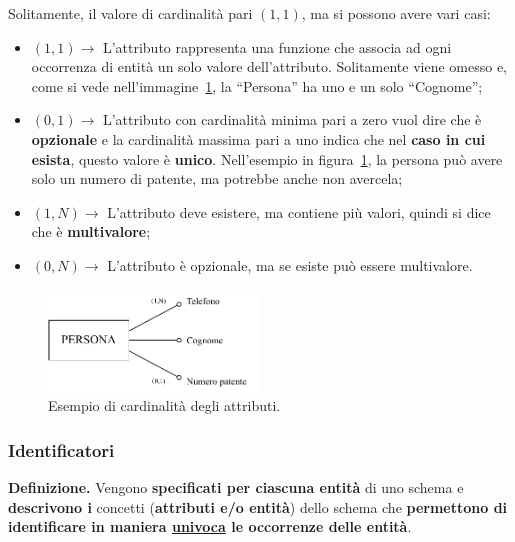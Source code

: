 \documentclass[a4paper]{article}
\newcommand{\dquotes}[1]{``#1''}
\begin{document}
	\noindent
	Solitamente, il valore di cardinalità pari $\left(1,1\right)$,  ma si possono avere vari casi:
	
	\begin{itemize}
		\item $\left(1, 1\right) \longrightarrow$ L'attributo rappresenta una funzione che associa ad ogni occorrenza di entità un solo valore dell'attributo. Solitamente viene omesso e, come si vede nell'immagine~\ref{esempio cardinalità attributi}, la \dquotes{Persona} ha uno e un solo \dquotes{Cognome};
		
		\item $\left(0, 1\right) \longrightarrow$ L'attributo con cardinalità minima pari a zero vuol dire che è \textbf{opzionale} e la cardinalità massima pari a uno indica che nel \textbf{caso in cui esista}, questo valore è \textbf{unico}. Nell'esempio in figura~\ref{esempio cardinalità attributi}, la persona può avere solo un numero di patente, ma potrebbe anche non avercela;
		
		\item $\left(1, N\right) \longrightarrow$ L'attributo deve esistere, ma contiene più valori, quindi si dice che è \textbf{multivalore};
		
		\item $\left(0, N\right) \longrightarrow$ L'attributo è opzionale, ma se esiste può essere multivalore.
	\end{itemize}
	
	\begin{figure}[!htp]
		\centering
		\includegraphics[width=0.5\textwidth]{img/cardinalita-attributi_def.pdf}
		\caption{Esempio di cardinalità degli attributi.}\label{esempio cardinalità attributi}
	\end{figure}

	\newpage

	\subsubsection{Identificatori}
	
	\textcolor{Red3}{\textbf{Definizione.}} Vengono \textbf{specificati per ciascuna entità} di uno schema e \textbf{descrivono i} concetti (\textbf{attributi e/o entità}) dello schema che \textbf{permettono di identificare in maniera \underline{univoca} le occorrenze delle entità}.\newline
	
\end{document}

